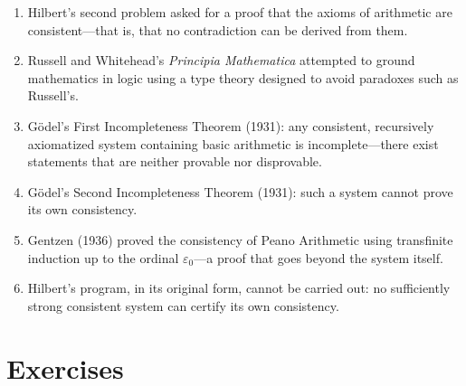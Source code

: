 \begin{enumerate}
    \item Hilbert's second problem asked for a proof that the axioms of arithmetic are consistent---that is, that no contradiction can be derived from them.
    \item Russell and Whitehead's \textit{Principia Mathematica} attempted to ground mathematics in logic using a type theory designed to avoid paradoxes such as Russell's.
    \item G\"odel's First Incompleteness Theorem (1931): any consistent, recursively axiomatized system containing basic arithmetic is incomplete---there exist statements that are neither provable nor disprovable.
    \item G\"odel's Second Incompleteness Theorem (1931): such a system cannot prove its own consistency.
    \item Gentzen (1936) proved the consistency of Peano Arithmetic using transfinite induction up to the ordinal $\varepsilon_0$---a proof that goes beyond the system itself.
    \item Hilbert's program, in its original form, cannot be carried out: no sufficiently strong consistent system can certify its own consistency.
\end{enumerate}

\section{Exercises}

